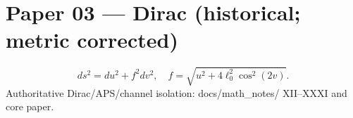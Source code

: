 \documentclass[11pt]{article}
\begin{document}
\section*{Paper 03 — Dirac (historical; metric corrected)}
\[
ds^2=du^2+f^2 dv^2,\quad f=\sqrt{u^2+4\ell_0^2\cos^2(2v)}.
\]
Authoritative Dirac/APS/channel isolation: docs/math\_notes/ XII--XXXI and core paper.
\end{document}
